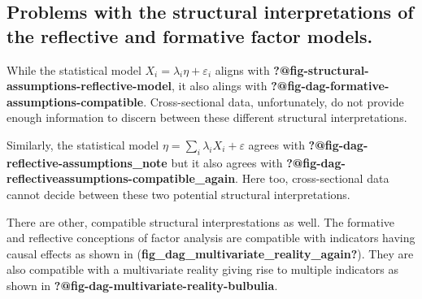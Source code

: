 \documentclass[
  letterpaper,
  DIV=11,
  numbers=noendperiod]{scrartcl}
\begin{document}
\hypertarget{problems-with-the-structural-interpretations-of-the-reflective-and-formative-factor-models.}{%
\subsection{Problems with the structural interpretations of the
reflective and formative factor
models.}\label{problems-with-the-structural-interpretations-of-the-reflective-and-formative-factor-models.}}

While the statistical model \(X_i = \lambda_i \eta + \varepsilon_i\)
aligns with \textbf{?@fig-structural-assumptions-reflective-model}, it
also alings with \textbf{?@fig-dag-formative-assumptions-compatible}.
Cross-sectional data, unfortunately, do not provide enough information
to discern between these different structural interpretations.

Similarly, the statistical model
\(\eta = \sum_i\lambda_i X_i + \varepsilon\) agrees with
\textbf{?@fig-dag-reflective-assumptions\_note} but it also agrees with
\textbf{?@fig-dag-reflectiveassumptions-compatible\_again}. Here too,
cross-sectional data cannot decide between these two potential
structural interpretations.

There are other, compatible structural interprestations as well. The
formative and reflective conceptions of factor analysis are compatible
with indicators having causal effects as shown in
(\textbf{fig\_dag\_multivariate\_reality\_again?}). They are also
compatible with a multivariate reality giving rise to multiple
indicators as shown in \textbf{?@fig-dag-multivariate-reality-bulbulia}.
\end{document}
